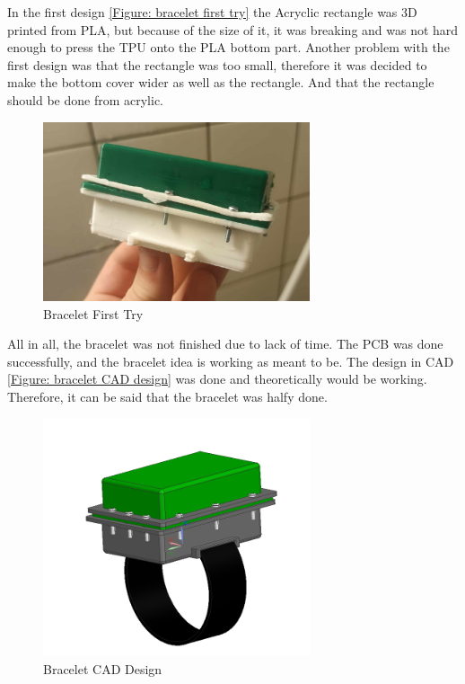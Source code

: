 In the first design \autoref{Figure: bracelet first try} the Acryclic rectangle was 3D printed from PLA, but because of the size of it, it was breaking and was not hard enough to 
press the TPU onto the PLA bottom part. Another problem with the first design was that the rectangle was too small, therefore it was decided 
to make the bottom cover wider as well as the rectangle. And that the rectangle should be done from acrylic.\\
\begin{figure}[H]
    \centering
    \includegraphics[width=0.7\textwidth]{bracelet_1.jpg}
    \caption{Bracelet First Try}
    \label{Figure: bracelet first try}
\end{figure} 
All in all, the bracelet was not finished due to lack of time. The PCB was done successfully, and the bracelet idea is working as meant to be. 
The design in CAD \autoref{Figure: bracelet CAD design} was done and theoretically would be working. Therefore, it can be said that the bracelet was halfy done.
\begin{figure}[H]
    \centering
    \includegraphics[width=0.7\textwidth]{bracelet.png}
    \caption{Bracelet CAD Design}
    \label{Figure: bracelet CAD design}
\end{figure} 